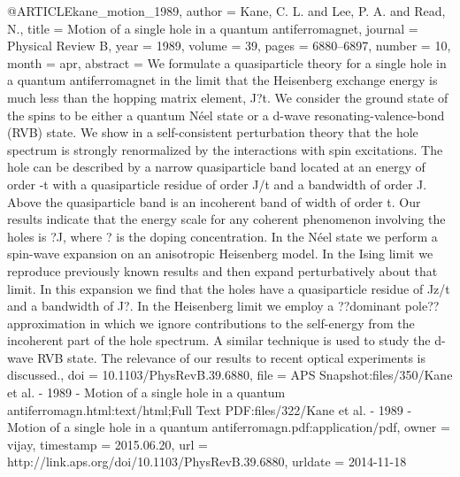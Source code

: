 @ARTICLE{kane_motion_1989,
  author = {Kane, C. L. and Lee, P. A. and Read, N.},
  title = {Motion of a single hole in a quantum antiferromagnet},
  journal = {Physical Review B},
  year = {1989},
  volume = {39},
  pages = {6880--6897},
  number = {10},
  month = apr,
  abstract = {We formulate a quasiparticle theory for a single hole in a quantum
	antiferromagnet in the limit that the Heisenberg exchange energy
	is much less than the hopping matrix element, J?t. We consider the
	ground state of the spins to be either a quantum Néel state or a
	d-wave resonating-valence-bond (RVB) state. We show in a self-consistent
	perturbation theory that the hole spectrum is strongly renormalized
	by the interactions with spin excitations. The hole can be described
	by a narrow quasiparticle band located at an energy of order -t with
	a quasiparticle residue of order J/t and a bandwidth of order J.
	Above the quasiparticle band is an incoherent band of width of order
	t. Our results indicate that the energy scale for any coherent phenomenon
	involving the holes is ?J, where ? is the doping concentration. In
	the Néel state we perform a spin-wave expansion on an anisotropic
	Heisenberg model. In the Ising limit we reproduce previously known
	results and then expand perturbatively about that limit. In this
	expansion we find that the holes have a quasiparticle residue of
	Jz/t and a bandwidth of J?. In the Heisenberg limit we employ a ??dominant
	pole?? approximation in which we ignore contributions to the self-energy
	from the incoherent part of the hole spectrum. A similar technique
	is used to study the d-wave RVB state. The relevance of our results
	to recent optical experiments is discussed.},
  doi = {10.1103/PhysRevB.39.6880},
  file = {APS Snapshot:files/350/Kane et al. - 1989 - Motion of a single hole in a quantum antiferromagn.html:text/html;Full Text PDF:files/322/Kane et al. - 1989 - Motion of a single hole in a quantum antiferromagn.pdf:application/pdf},
  owner = {vijay},
  timestamp = {2015.06.20},
  url = {http://link.aps.org/doi/10.1103/PhysRevB.39.6880},
  urldate = {2014-11-18}
}


